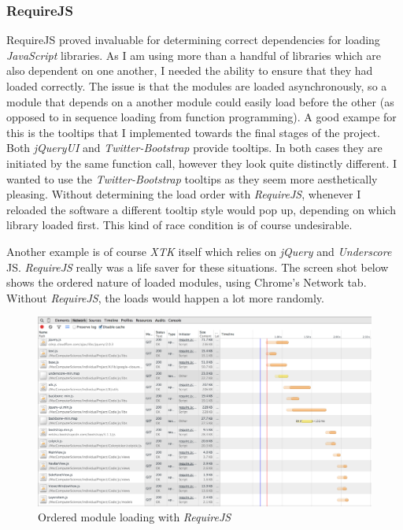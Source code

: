 \documentclass[a4paper,11pt,twoside]{article}
\begin{document}
\subsubsection{RequireJS}

RequireJS proved invaluable for determining correct dependencies for loading \textit{JavaScript} libraries. As I am using more than a handful of libraries which are also dependent on one another, I needed the ability to ensure that they had loaded correctly. The issue is that the modules are loaded asynchronously, so a module that depends on a another module could easily load before the other (as opposed to in sequence loading from function programming). A good exampe for this is the tooltips that I implemented towards the final stages of the project. Both \textit{jQueryUI} and \textit{Twitter-Bootstrap} provide tooltips. In both cases they are initiated by the same function call, however they look quite distinctly different. I wanted to use the \textit{Twitter-Bootstrap} tooltips as they seem more aesthetically pleasing. Without determining the load order with \textit{RequireJS}, whenever I reloaded the software a different tooltip style would pop up, depending on which library loaded first. This kind of race condition is of course undesirable.

Another example is of course \textit{XTK} itself which relies on \textit{jQuery} and \textit{Underscore} JS. \textit{RequireJS} really was a life saver for these situations. The screen shot below shows the ordered nature of loaded modules, using Chrome's Network tab. Without \textit{RequireJS}, the loads would happen a lot more randomly.


\begin{figure}[ht!]
\centering
\includegraphics[width=120mm]{graphics/requireOrder_01.png}
\caption{Ordered module loading with \textit{RequireJS}}
\label{fig:UIdesign1}
\end{figure}
\end{document}
